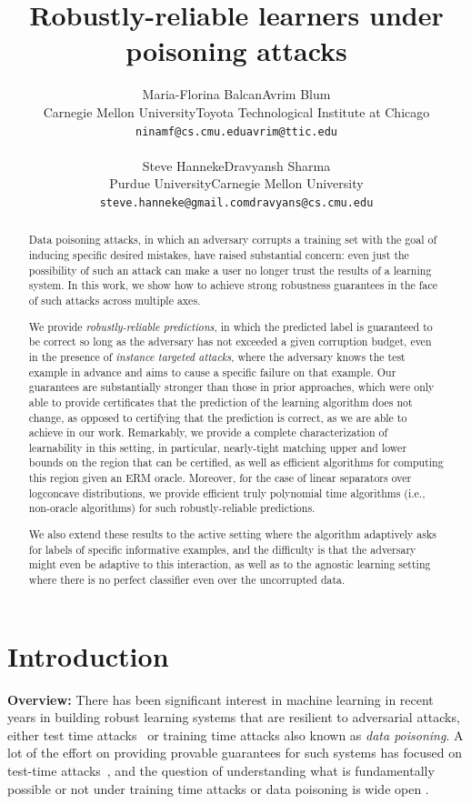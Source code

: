 \documentclass[11pt]{article}
\title{Robustly-reliable learners under poisoning attacks}
\author{\begin{tabular}{cc}{Maria-Florina Balcan} & {Avrim Blum}\\{Carnegie Mellon University} & {Toyota Technological Institute at Chicago}\\{\tt ninamf@cs.cmu.edu} & {\tt avrim@ttic.edu} \\ & \\ { Steve Hanneke} &   {Dravyansh Sharma}\\{Purdue University} & {Carnegie Mellon University}\\
{\tt steve.hanneke@gmail.com} & {\tt dravyans@cs.cmu.edu}\end{tabular}}
\newcommand{\0}{\mathbf{0}}
\newcommand{\1}{\mathbf{1}}
\begin{document}
 \maketitle

\begin{abstract}%
{Data poisoning} attacks, in which an adversary corrupts a training set with the goal of inducing specific desired mistakes, have raised substantial concern: even just the possibility of such an attack can make a user no longer trust the results of a learning system. In this work, we show how to achieve strong robustness guarantees in the face of such attacks across multiple axes.

We provide {\em robustly-reliable predictions}, in which the predicted label is guaranteed to be correct so long as the adversary has not exceeded a given corruption budget, even in the presence of {\em instance targeted attacks}, where the adversary knows the test example in advance and aims to cause a specific failure on that example.
 Our guarantees are substantially stronger than those in prior approaches, which were only able to provide certificates that the prediction of the learning algorithm does not change,  as opposed to certifying that the prediction is correct, as we are able to achieve in our work.
Remarkably, we provide a complete characterization of learnability in this setting, in particular,  nearly-tight matching upper and lower bounds on the region that can be certified, as well as efficient algorithms for computing this region given an ERM oracle. Moreover, for the case of linear separators over logconcave distributions, we provide efficient truly polynomial time algorithms (i.e., non-oracle algorithms) for such robustly-reliable predictions.

We also extend these results to the active setting where the algorithm adaptively asks for labels of specific informative examples, and the difficulty is that the adversary might even be adaptive to this interaction, as well as to the  agnostic learning setting where there is no perfect classifier even over the uncorrupted data.
\end{abstract}


\section{Introduction}
{\bf Overview:}
There has been significant interest in machine learning in recent years in building robust learning systems that are resilient to adversarial attacks, either test time attacks~\citep{goodfellow2014explaining,carlini2017towards,madry2018towards,zhang2019theoretically} or training time attacks \citep{steinhardt2017certified,shafahi2018poison} also known as {\em data poisoning}.
A lot of the effort on providing provable guarantees for such systems has focused on test-time attacks~\citep[e.g.,][]{DBLP:conf/icml/YinRB19,DBLP:conf/alt/AttiasKM19,montasser2019vc,DBLP:conf/nips/MontasserHS20,montasser2021adversarially,goldwasser2020beyond}, and the question of understanding what is fundamentally possible or not under training time attacks or data poisoning is wide open \citep{barreno2006can,levine2020deep}.
\end{document}
